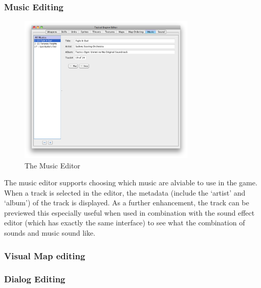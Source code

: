 \subsubsection{Music Editing}
\begin{figure}[htb]
	\centering
		\includegraphics[width=0.75\textwidth]{figures/editor/Music.png}
	\caption{The Music Editor}
	\label{fig:figures_editor_Music}
\end{figure}
The music editor supports choosing which music are alviable to use in the game.  When a track is selected in the editor, the metadata (include the `artist' and `album') of the track is displayed.  As a further enhancement, the track can be previewed this especially useful when used in combination with the  sound effect editor (which has exactly the same interface) to see what the combination of sounds and music sound like. 

\clearpage

\subsubsection{Visual Map editing}

\clearpage
\subsubsection{Dialog Editing}
\label{ssub:dialog_editing}

